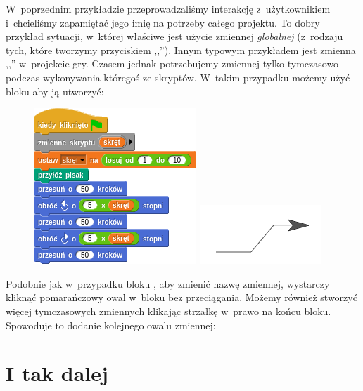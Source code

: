 \documentclass[a4paper]{report}
\begin{document}
W~poprzednim przykładzie przeprowadzaliśmy interakcję z~użytkownikiem i~chcieliśmy zapamiętać jego imię na potrzeby całego projektu. To dobry przykład sytuacji, w~której właściwe jest użycie zmiennej \emph{globalnej} (z~rodzaju tych, które tworzymy przyciskiem ,,''). Innym typowym przykładem jest zmienna ,,'' w~projekcie gry. Czasem jednak potrzebujemy zmiennej tylko tymczasowo podczas wykonywania któregoś ze skryptów. W~takim przypadku możemy użyć bloku  aby ją utworzyć:\nopagebreak

\begin{figure}[H]
\begin{minipage}{0.5\textwidth}
\centering
\includegraphics[scale=\defaultGraphicsScale]{skrypt-skrecajacej-linii}%
\end{minipage}%
\begin{minipage}{0.5\textwidth}
\centering
\includegraphics{../common/wiggling-line}
\end{minipage}%
\end{figure}

Podobnie jak w~przypadku bloku , aby zmienić nazwę zmiennej, wystarczy kliknąć pomarańczowy owal w~bloku  bez przeciągania. Możemy również stworzyć więcej tymczasowych zmiennych klikając strzałkę w~prawo na końcu bloku. Spowoduje to dodanie kolejnego owalu zmiennej:\nopagebreak


\section{I tak dalej}
\end{document}
